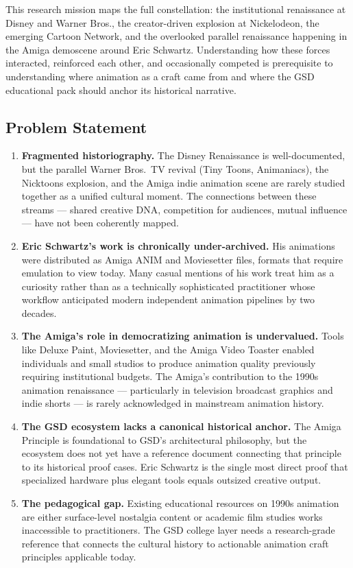 \documentclass[11pt,letterpaper]{article}
\begin{document}
This research mission maps the full constellation: the institutional renaissance at Disney and Warner Bros., the creator-driven explosion at Nickelodeon, the emerging Cartoon Network, and the overlooked parallel renaissance happening in the Amiga demoscene around Eric Schwartz. Understanding how these forces interacted, reinforced each other, and occasionally competed is prerequisite to understanding where animation as a craft came from and where the GSD educational pack should anchor its historical narrative.

\subsection{Problem Statement}

\begin{enumerate}[leftmargin=2em]
  \item \textbf{Fragmented historiography.} The Disney Renaissance is well-documented, but the parallel Warner Bros.\ TV revival (Tiny Toons, Animaniacs), the Nicktoons explosion, and the Amiga indie animation scene are rarely studied together as a unified cultural moment. The connections between these streams --- shared creative DNA, competition for audiences, mutual influence --- have not been coherently mapped.

  \item \textbf{Eric Schwartz's work is chronically under-archived.} His animations were distributed as Amiga ANIM and Moviesetter files, formats that require emulation to view today. Many casual mentions of his work treat him as a curiosity rather than as a technically sophisticated practitioner whose workflow anticipated modern independent animation pipelines by two decades.

  \item \textbf{The Amiga's role in democratizing animation is undervalued.} Tools like Deluxe Paint, Moviesetter, and the Amiga Video Toaster enabled individuals and small studios to produce animation quality previously requiring institutional budgets. The Amiga's contribution to the 1990s animation renaissance --- particularly in television broadcast graphics and indie shorts --- is rarely acknowledged in mainstream animation history.

  \item \textbf{The GSD ecosystem lacks a canonical historical anchor.} The Amiga Principle is foundational to GSD's architectural philosophy, but the ecosystem does not yet have a reference document connecting that principle to its historical proof cases. Eric Schwartz is the single most direct proof that specialized hardware plus elegant tools equals outsized creative output.

  \item \textbf{The pedagogical gap.} Existing educational resources on 1990s animation are either surface-level nostalgia content or academic film studies works inaccessible to practitioners. The GSD college layer needs a research-grade reference that connects the cultural history to actionable animation craft principles applicable today.
\end{enumerate}
\end{document}
